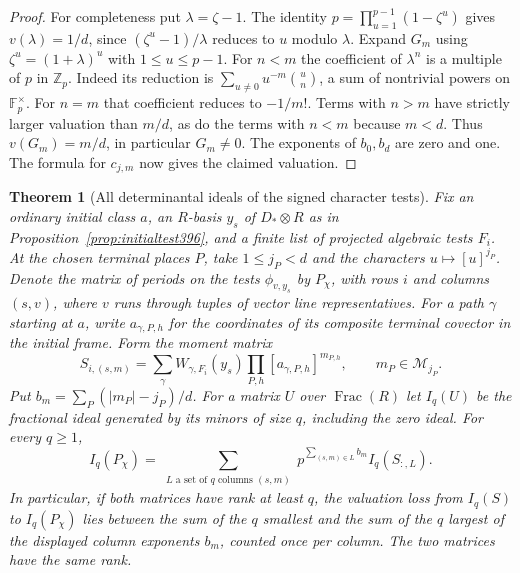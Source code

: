 \documentclass[a4paper,11pt]{article}
\newtheorem{theorem}[proposition]{Theorem}
\theoremstyle{definition}
\theoremstyle{remark}
\newcommand{\ZZ}{\mathbb Z}\newcommand{\ord}{\operatorname{ord}}
\numberwithin{equation}{section}
\begin{document}
\begin{proof}
For completeness put \(\lambda=\zeta-1\). The identity
\(p=\prod_{u=1}^{p-1}(1-\zeta^u)\) gives \(v(\lambda)=1/d\),
since \((\zeta^u-1)/\lambda\) reduces to \(u\) modulo \(\lambda\).
Expand \(G_m\) using \(\zeta^u=(1+\lambda)^u\) with
\(1\le u\le p-1\). For \(n<m\) the coefficient of \(\lambda^n\)
is a multiple of \(p\) in \(\ZZ_p\). Indeed its reduction is
\(\sum_{u\ne0}u^{-m}\binom{u}{n}\), a sum of nontrivial
powers on \(\mathbb F_p^\times\). For \(n=m\) that coefficient
reduces to \(-1/m!\). Terms with \(n>m\) have strictly larger
valuation than \(m/d\), as do the terms with \(n<m\) because
\(m<d\). Thus \(v(G_m)=m/d\), in particular \(G_m\ne0\).
The exponents of \(b_0,b_d\) are zero and one. The formula for
\(c_{j,m}\) now gives the claimed valuation.
\end{proof}

\begin{theorem}[All determinantal ideals of the signed character tests]\leavevmode
\label{thm:periodminors400}
Fix an ordinary initial class \(a\), an \(R\)-basis \(y_s\) of
\(D_*\otimes R\) as in Proposition~\ref{prop:initialtest396}, and
a finite list of projected algebraic tests \(F_i\). At the chosen
terminal places \(P\), take \(1\le j_P<d\) and the characters
\(u\mapsto[u]^{j_P}\). Denote the matrix of periods on the tests
\(\phi_{v,y_s}\) by \(P_\chi\), with rows \(i\) and columns
\((s,v)\), where \(v\) runs through tuples of vector line
representatives. For a path \(\gamma\) starting at \(a\), write
\(a_{\gamma,P,h}\) for the coordinates of its composite terminal
covector in the initial frame. Form the moment matrix
\[
 S_{i,(s,m)}=\sum_{\gamma} W_{\gamma,F_i}(y_s)
                          \prod_{P,h}[a_{\gamma,P,h}]^{m_{P,h}},
 \qquad m_P\in\mathcal M_{j_P}.
\]
Put \(b_m=\sum_P(|m_P|-j_P)/d\). For a matrix \(U\) over
\(\operatorname{Frac}(R)\) let \(I_q(U)\) be the fractional ideal
generated by its minors of size \(q\), including the zero ideal.
For every \(q\ge1\),
\[
 I_q(P_\chi)=
  \sum_{\substack{L\text{ a set of }q\text{ columns }(s,m)}}
           p^{\sum_{(s,m)\in L}b_m} I_q(S_{:,L}) .
\]
In particular, if both matrices have rank at least \(q\), the
valuation loss from \(I_q(S)\) to \(I_q(P_\chi)\) lies between
the sum of the \(q\) smallest and the sum of the \(q\) largest
of the displayed column exponents \(b_m\), counted once per
column. The two matrices have the same rank.
\end{theorem}
\end{document}
